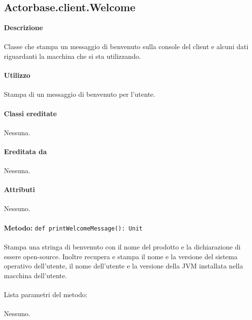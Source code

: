\documentclass[a4paper]{article}
\begin{document}
	\subsection{Actorbase.client.Welcome}	
		\textbf{Descrizione}
			\\ \\
			Classe che stampa un messaggio di benvenuto sulla console del client e alcuni dati riguardanti la macchina che si sta utilizzando.
			\\ \\
		\textbf{Utilizzo}
			\\ \\
			Stampa di un messaggio di benvenuto per l'utente.
			\\ \\
		\textbf{Classi ereditate}
			\\ \\
			Nessuna.
			\\ \\
		\textbf{Ereditata da}
			\\ \\
			Nessuna.
			\\ \\
		\textbf{Attributi}
			\\ \\
			Nessuno.
			\\ \\
			\textbf{Metodo: }\texttt{def printWelcomeMessage(): Unit}
			\\ \\
			Stampa una stringa di benvenuto con il nome del prodotto e la dichiarazione di essere open-source. Inoltre recupera e stampa il nome e la versione del sistema operativo dell'utente, il nome dell'utente e la versione della JVM installata nella macchina dell'utente.
			\\ \\
			Lista parametri del metodo:
			\\ \\
				Nessuno.
			\\ \\
			
\end{document}

